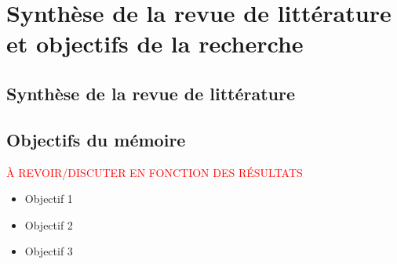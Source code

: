 \chapter{Synthèse de la revue de littérature et objectifs de la recherche}\label{sec:SyntheseRev}
\section{Synthèse de la revue de littérature}

\section{Objectifs du mémoire}

\textcolor{red}{À REVOIR/DISCUTER EN FONCTION DES RÉSULTATS}

\begin{itemize} %
    \item[\ding{226}] Objectif 1
    
    \item[\ding{226}] Objectif 2
    
    \item[\ding{226}] Objectif 3
\end{itemize}